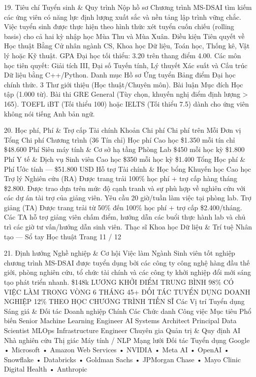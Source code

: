 19. Tiêu chí Tuyển sinh \& Quy trình Nộp hồ sơ
Chương trình MS-DSAI tìm kiếm các ứng viên có năng lực định lượng xuất sắc và nền tảng lập trình vững chắc. Việc tuyển sinh được thực hiện theo hình thức xét tuyển cuốn chiếu (rolling basis) cho cả hai kỳ nhập học Mùa Thu và Mùa Xuân.
Điều kiện Tiên quyết về Học thuật
Bằng Cử nhân ngành CS, Khoa học Dữ liệu, Toán học, Thống kê,
Vật lý hoặc Kỹ thuật.
GPA Đại học tối thiểu: 3.20 trên thang điểm 4.00.
Các môn học tiên quyết: Giải tích III, Đại số Tuyến tính,
Lý thuyết Xác suất và Cấu trúc Dữ liệu bằng C++/Python.
Danh mục Hồ sơ Ứng tuyển
Bảng điểm Đại học chính thức.
3 Thư giới thiệu (Học thuật/Chuyên môn).
Bài luận Mục đích Học tập (1.000 từ).
Bài thi GRE General (Tùy chọn, khuyến nghị điểm định lượng > 165).
TOEFL iBT (Tối thiểu 100) hoặc IELTS (Tối thiểu 7.5) dành cho ứng viên
không nói tiếng Anh bản ngữ.

20. Học phí, Phí \& Trợ cấp Tài chính
Khoản Chi phí
Chi phí trên Mỗi Đơn vị
Tổng Chi phí Chương trình (36 Tín chỉ)
Học phí Cao học
\$1.350 mỗi tín chỉ
\$48.600
Phí Siêu máy tính \& Cơ sở hạ tầng Phòng Lab
\$450 mỗi học kỳ
\$1.800
Phí Y tế \& Dịch vụ Sinh viên Cao học
\$350 mỗi học kỳ
\$1.400
Tổng Học phí \& Phí Ước tính
—
\$51.800 USD
Hỗ trợ Tài chính \& Học bổng Khuyến học Cao học
Trợ lý Nghiên cứu (RA)
Được trang trải 100\% học phí + trợ cấp hàng tháng \$2.800.
Được trao dựa trên mức độ cạnh tranh và sự phù hợp về nghiên cứu với
các dự án tài trợ của giảng viên. Yêu cầu 20 giờ/tuần làm việc tại phòng lab.
Trợ giảng (TA)
Được trang trải từ 50\% đến 100\% học phí + trợ cấp \$2.400/tháng.
Các TA hỗ trợ giảng viên chấm điểm, hướng dẫn các buổi thực hành
lab và chủ trì các giờ tư vấn/hướng dẫn sinh viên.
Thạc sĩ Khoa học Dữ liệu \& Trí tuệ Nhân tạo — Sổ tay Học thuật
Trang 11 / 12

21. Định hướng Nghề nghiệp \& Cơ hội Việc làm Ngành
Sinh viên tốt nghiệp chương trình MS-DSAI được tuyển dụng bởi các công ty công nghệ hàng đầu thế giới, phòng nghiên cứu, tổ chức tài chính và các công ty khởi nghiệp đổi mới sáng tạo phát triển nhanh.
\$148k
LƯƠNG KHỞI ĐIỂM TRUNG BÌNH
98\%
CÓ VIỆC LÀM TRONG VÒNG 6 THÁNG
45+
ĐỐI TÁC TUYỂN DỤNG DOANH NGHIỆP
12\%
THEO HỌC CHƯƠNG TRÌNH TIẾN SĨ
Các Vị trí Tuyển dụng Sáng giá \& Đối tác Doanh nghiệp Chính
Các Chức danh Công việc Mục tiêu Phổ biến
Senior Machine Learning Engineer
AI Systems Architect
Principal Data Scientist
MLOps Infrastructure Engineer
Chuyên gia Quản trị \& Quy định AI
Nhà nghiên cứu Thị giác Máy tính / NLP
Mạng lưới Đối tác Tuyển dụng
Google • Microsoft • Amazon Web Services • NVIDIA • Meta AI
• OpenAI • Snowflake • Databricks • Goldman Sachs •
JPMorgan Chase • Mayo Clinic Digital Health • Anthropic

